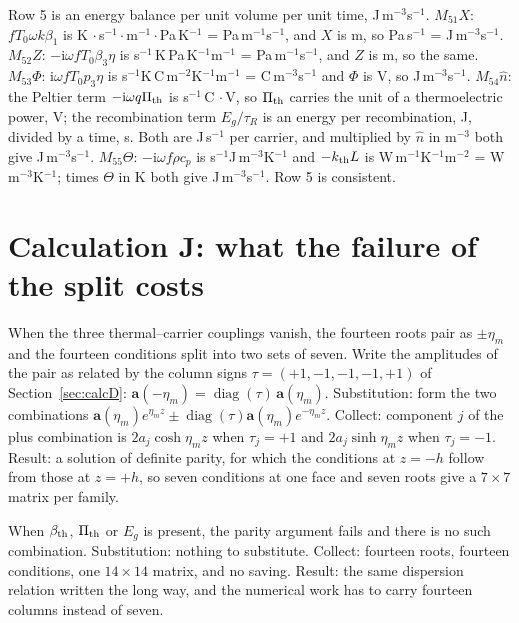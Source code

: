 \documentclass[11pt]{article}
\makeatletter
\newif\ifshowworked
\newenvironment{worked}{%
  \ifshowworked\par\smallskip\noindent\textit{Working.}\par\smallskip\else
  \setbox\z@\vbox\bgroup\fi}{\ifshowworked\par\smallskip\else\egroup\fi}
\newcommand{\ii}{\mathrm{i}}
\makeatother
\begin{document}
\begin{worked}
Row 5 is an energy balance per unit volume per unit time, J\,m$^{-3}$s$^{-1}$.
$M_{51}X$: $fT_0\omega k\beta_1$ is K$\,\cdot$s$^{-1}\cdot$m$^{-1}\cdot$Pa\,K$^{-1}$ = Pa\,m$^{-1}$s$^{-1}$,
and $X$ is m, so Pa\,s$^{-1}$ = J\,m$^{-3}$s$^{-1}$.
$M_{52}Z$: $-\ii\omega fT_0\beta_3\eta$ is s$^{-1}\,$K$\,$Pa\,K$^{-1}$m$^{-1}$ = Pa\,m$^{-1}$s$^{-1}$, and
$Z$ is m, so the same.
$M_{53}\Phi$: $\ii\omega fT_0p_3\eta$ is
s$^{-1}$K$\,$C\,m$^{-2}$K$^{-1}$m$^{-1}$ = C\,m$^{-3}$s$^{-1}$ and $\Phi$ is V, so J\,m$^{-3}$s$^{-1}$.
$M_{54}\hat n$: the Peltier term $-\ii\omega q\Pi_{\rm th}$ is
s$^{-1}\,$C$\,\cdot$V, so $\Pi_{\rm th}$ carries the unit of a thermoelectric power, V; the recombination
term $E_g/\tau_R$ is an energy per recombination, J, divided by a time, s. Both are J\,s$^{-1}$ per carrier,
and multiplied by $\hat n$ in m$^{-3}$ both give J\,m$^{-3}$s$^{-1}$.
$M_{55}\Theta$: $-\ii\omega f\rho c_p$ is s$^{-1}$J\,m$^{-3}$K$^{-1}$ and $-k_{\rm th}L$ is
W\,m$^{-1}$K$^{-1}$m$^{-2}$ = W\,m$^{-3}$K$^{-1}$; times $\Theta$ in K both give J\,m$^{-3}$s$^{-1}$. Row 5
is consistent.
\end{worked}

\section{Calculation J: what the failure of the split costs}

\begin{worked}
When the three thermal--carrier couplings vanish, the fourteen roots pair as $\pm\eta_m$ and the fourteen
conditions split into two sets of seven. Write the amplitudes of the pair as related by the column signs
$\tau=(+1,-1,-1,-1,+1)$ of Section~\ref{sec:calcD}: $\mathbf a(-\eta_m)=\operatorname{diag}(\tau)\,
\mathbf a(\eta_m)$. Substitution: form the two combinations
$\mathbf a(\eta_m)e^{\eta_mz}\pm\operatorname{diag}(\tau)\mathbf a(\eta_m)e^{-\eta_mz}$. Collect: component
$j$ of the plus combination is $2a_j\cosh\eta_mz$ when $\tau_j=+1$ and $2a_j\sinh\eta_mz$ when
$\tau_j=-1$. Result: a solution of definite parity, for which the conditions at $z=-h$ follow from those at
$z=+h$, so seven conditions at one face and seven roots give a $7\times7$ matrix per family.
\end{worked}

\begin{worked}
When $\beta_{\rm th}$, $\Pi_{\rm th}$ or $E_g$ is present, the parity argument fails and there is no such
combination. Substitution: nothing to substitute. Collect: fourteen roots, fourteen conditions, one
$14\times14$ matrix, and no saving. Result: the same dispersion relation written the long way, and the
numerical work has to carry fourteen columns instead of seven.
\end{worked}
\end{document}
